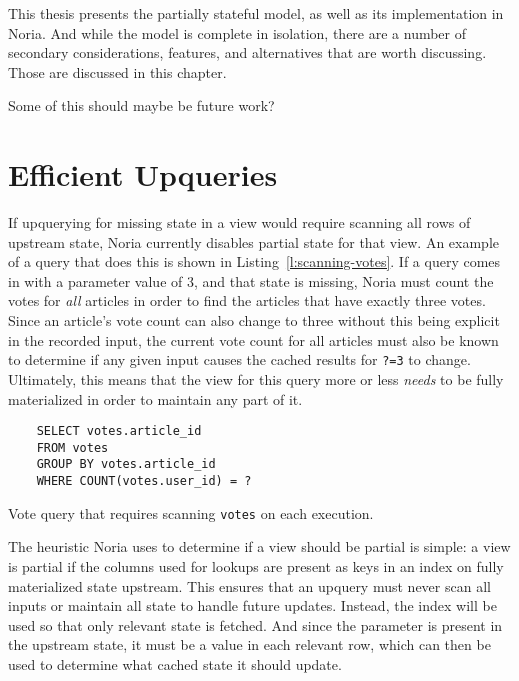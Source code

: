 This thesis presents the partially stateful model, as well as its implementation
in Noria. And while the model is complete in isolation, there are a number of
secondary considerations, features, and alternatives that are worth discussing.
Those are discussed in this chapter.

\begin{inprogress}
Some of this should maybe be future work?
\end{inprogress}

\section{Efficient Upqueries}

If upquerying for missing state in a view would require scanning all rows of
upstream state, Noria currently disables partial state for that view. An example
of a query that does this is shown in Listing~\ref{l:scanning-votes}. If a query
comes in with a parameter value of 3, and that state is missing, Noria must
count the votes for \emph{all} articles in order to find the articles that have
exactly three votes. Since an article's vote count can also change to three
without this being explicit in the recorded input, the current vote count for
all articles must also be known to determine if any given input causes the
cached results for \texttt{?=3} to change. Ultimately, this means that the view
for this query more or less \emph{needs} to be fully materialized in order to
maintain any part of it.

\begin{listing}[h]
  \begin{verbatim}
    SELECT votes.article_id
    FROM votes
    GROUP BY votes.article_id
    WHERE COUNT(votes.user_id) = ?
  \end{verbatim}
  \caption{Vote query that requires scanning \texttt{votes} on each execution.}
  \label{l:scanning-votes}
\end{listing}

The heuristic Noria uses to determine if a view should be partial is simple: a
view is partial if the columns used for lookups are present as keys in an index
on fully materialized state upstream. This ensures that an upquery must never
scan all inputs or maintain all state to handle future updates. Instead, the
index will be used so that only relevant state is fetched. And since the
parameter is present in the upstream state, it must be a value in each relevant
row, which can then be used to determine what cached state it should update.

